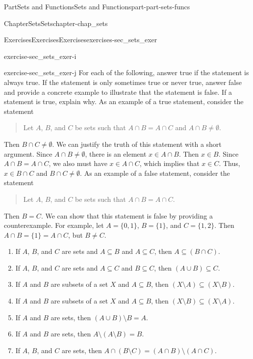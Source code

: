 \documentclass[oneside,10pt,]{book}
\numberwithin{equation}{chapter}
\begin{document}
\begin{partptx}{Part}{Sets and Functions}{}{Sets and Functions}{}{}{part-part-sets-funcs}
\begin{chapterptx}{Chapter}{Sets}{}{Sets}{}{}{chapter-chap_sets}
\begin{exercises-section}{Exercises}{Exercises}{}{Exercises}{}{}{exercises-sec_sets_exer}
\begin{divisionexercise}{9}{}{}{exercise-sec_sets_exer-i}
\end{divisionexercise}%
\begin{divisionexercise}{10}{}{}{exercise-sec_sets_exer-j}%
For each of the following, answer true if the statement is always true. If the statement is only sometimes true or never true, answer false and provide a concrete example to illustrate that the statement is false. If a statement is true, explain why. As an example of a true statement, consider the statement%
\begin{quote}%
Let \(A\), \(B\), and \(C\) be sets such that \(A \cap B = A \cap C\) and \(A \cap B \neq \emptyset\).%
\end{quote}
Then \(B \cap C \neq \emptyset\). We can justify the truth of this statement with a short argument. Since \(A \cap B \neq \emptyset\), there is an element \(x \in A \cap B\). Then \(x \in B\). Since \(A \cap B = A \cap C\), we also must have \(x \in A \cap C\), which implies that \(x \in C\). Thus, \(x \in B \cap C\) and \(B \cap C \neq \emptyset\). As an example of a false statement, consider the statement%
\begin{quote}%
Let \(A\), \(B\), and \(C\) be sets such that \(A \cap B = A \cap C\).%
\end{quote}
Then \(B = C\). We can show that this statement is false by providing a counterexample. For example, let \(A = \{0,1\}\), \(B=\{1\}\), and \(C = \{1,2\}\). Then \(A \cap B = \{1\} = A \cap C\), but \(B \neq C\).%
\begin{enumerate}[font=\bfseries,label=(\alph*),ref=\alph*]%
\item{}If \(A\), \(B\), and \(C\) are sets and \(A \subseteq B\) and \(A \subseteq C\), then \(A \subseteq (B \cap C)\).%
\item{}If \(A\), \(B\), and \(C\) are sets and \(A \subseteq C\) and \(B \subseteq C\), then \((A \cup B) \subseteq C\).%
\item{}If \(A\) and \(B\) are subsets of a set \(X\) and \(A \subseteq B\), then \((X \setminus A) \subseteq (X \setminus B)\).%
\item{}If \(A\) and \(B\) are subsets of a set \(X\) and \(A \subseteq B\), then \((X \setminus B) \subseteq (X \setminus A)\).%
\item{}If \(A\) and \(B\) are sets, then \((A \cup B) \setminus B = A\).%
\item{}If \(A\) and \(B\) are sets, then \(A \setminus (A \setminus B) = B\).%
\item{}If \(A\), \(B\), and \(C\) are sets, then \(A \cap (B \setminus C) = (A \cap B) \setminus (A \cap C)\).%

\end{enumerate}
\end{divisionexercise}
\end{exercises-section}
\end{chapterptx}
\end{partptx}
\end{document}
